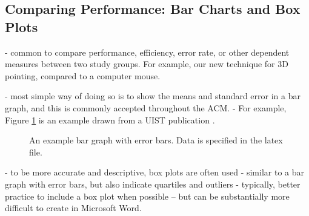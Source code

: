 \subsection{Comparing Performance: Bar Charts and Box Plots}

- common to compare performance, efficiency, error rate, or other dependent measures between two study groups. For example, our new technique for 3D pointing, compared to a computer mouse. 

- most simple way of doing so is to show the means and standard error in a bar graph, and this is commonly accepted throughout the ACM. 
- For example, Figure \ref{bargraph} is an example drawn from a UIST publication \cite{REF}.


\begin{figure}
\caption{An example bar graph with error bars. Data is specified in the latex file.}
\label{bargraph}
\end{figure}


- to be more accurate and descriptive, box plots are often used
- similar to a bar graph with error bars, but also indicate quartiles and outliers 
- typically, better practice to include a box plot when possible -- but can be substantially more difficult to create in Microsoft Word. 




